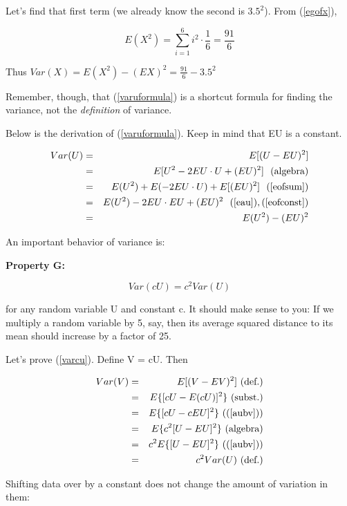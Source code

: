 Let's find that first term (we already know the second is $3.5^2$).  From
(\ref{egofx}),

\begin{equation}
E(X^2) =  \sum_{i=1}^6 i^2 \cdot \frac{1}{6} = \frac{91}{6}
\end{equation}

Thus $Var(X) = E(X^2) - (EX)^2 = \frac{91}{6} - 3.5^2$

Remember, though, that (\ref{varuformula}) is a shortcut formula for
finding the variance, not the {\it definition} of variance.

Below is the derivation of (\ref{varuformula}).  Keep in mind that EU is
a constant.

\begin{eqnarray}
Var(U) &=& E[(U-EU)^2] \\ 
&=& E[U^2 -2EU \cdot U + (EU)^2] ~~ \textrm{(algebra)} \\
&=& E(U^2) + E(-2 EU \cdot U) + E[(EU)^2] ~~ (\ref{eofsum}) \\
&=& E(U^2) -2 EU \cdot EU + (EU)^2 ~~ (\ref{eau}), (\ref{eofconst}) \\
&=& E(U^2) - (EU)^2
\end{eqnarray}

An important behavior of variance is: 

{\bf Property G:}

\begin{equation}
\label{varcu}
Var(cU) = c^2 Var(U)
\end{equation}

for any random variable U and constant c. It should make sense to you:
If we multiply a random variable by 5, say, then its average squared
distance to its mean should increase by a factor of 25. 

Let's prove (\ref{varcu}).  Define V = cU.  Then

\begin{eqnarray}
Var(V) &=& E[(V-EV)^2] \textrm{  (def.)} \\ 
&=& E\{[cU - E(cU)]^2\} \textrm{  (subst.)} \\
&=& E\{[cU - cEU]^2\} \textrm{  ((\ref{aubv}))} \\
&=& E\{c^2 [U - EU]^2\} \textrm{  (algebra)} \\
&=& c^2 E\{[U - EU]^2\} \textrm{  ((\ref{aubv}))} \\
&=& c^2 Var(U) \textrm{  (def.)}
\end{eqnarray}

Shifting data over by a constant does not change the amount of variation
in them:

